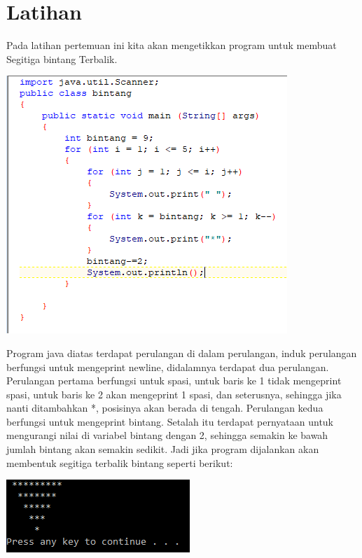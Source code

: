 \documentclass[a4paper,12pt]{article}
\begin{document}
\section{Latihan}
Pada latihan pertemuan ini kita akan mengetikkan program untuk membuat Segitiga bintang Terbalik.
\begin{center}
    \includegraphics[scale = 0.8]{latihan.PNG}
\end{center}
Program java diatas terdapat perulangan di dalam perulangan, induk perulangan berfungsi untuk mengeprint newline, didalamnya terdapat dua perulangan. Perulangan pertama berfungsi untuk spasi, 
untuk baris ke 1 tidak mengeprint spasi, untuk baris ke 2 akan mengeprint 1 spasi, dan seterusnya, sehingga jika nanti ditambahkan *, posisinya akan berada di tengah. Perulangan kedua berfungsi untuk mengeprint bintang. Setalah itu terdapat pernyataan untuk mengurangi nilai di variabel bintang dengan 2, sehingga semakin ke bawah jumlah bintang akan semakin sedikit.
Jadi jika program dijalankan akan membentuk segitiga terbalik bintang seperti berikut:
\begin{center}
    \includegraphics[scale = 0.8]{latihanb.PNG}
\end{center}

\newpage
\end{document}
